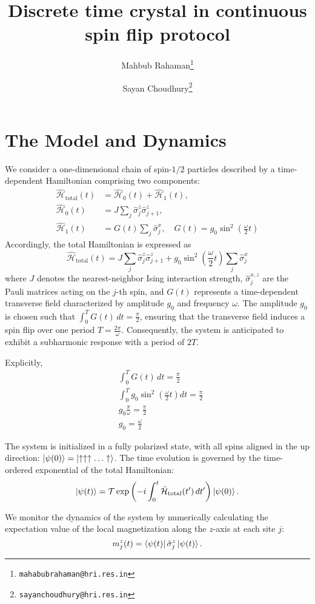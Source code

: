 \documentclass[a4paper, 11pt]{article}
\title{Discrete time crystal in continuous spin flip protocol}
\author[1]{Mahbub Rahaman\thanks{\texttt{mahabubrahaman@hri.res.in}}}
\author[1]{Sayan Choudhury\thanks{\texttt{sayanchoudhury@hri.res.in}}}
\affil[1]{\small Harish-Chandra Research Institute, HBNI, Chhatnag Road, Jhunsi, Praygraj, UP - 211019, India}
\date{}
\begin{document}
\maketitle

\section{The Model and Dynamics}
We consider a one-dimensional chain of spin-$1/2$ particles described by a time-dependent Hamiltonian comprising two components:
\begin{align}
    \hat{\mathcal{H}}_{\text{total}}(t) &=  \hat{\mathcal{H}}_0(t) + \hat{\mathcal{H}}_1(t), \\
    \hat{\mathcal{H}}_0(t) &= J\sum_{j} \hat{\sigma}_j^z \hat{\sigma}_{j+1}^z, \\
    \hat{\mathcal{H}}_1(t) &= G(t)\sum_{j}\hat{\sigma}_j^x, \quad G(t) = g_0\sin^2\left(\frac{\omega}{2} t\right)
\end{align}
Accordingly, the total Hamiltonian is expressed as
\begin{equation}
    \boxed{
        \hat{\mathcal{H}}_{\text{total}}(t) =  J\sum_{j} \hat{\sigma}_j^z \hat{\sigma}_{j+1}^z + g_0\sin^2\left(\frac{\omega}{2} t\right)\sum_{j}\hat{\sigma}_j^x
    }
\end{equation}
where $J$ denotes the nearest-neighbor Ising interaction strength, $\hat{\sigma}_j^{x,z}$ are the Pauli matrices acting on the $j$-th spin, and $G(t)$ represents a time-dependent transverse field characterized by amplitude $g_0$ and frequency $\omega$. The amplitude $g_0$ is chosen such that $\displaystyle \int_0^T G(t)\,dt = \frac{\pi}{2}$, ensuring that the transverse field induces a spin flip over one period $T = \frac{2\pi}{\omega}$. Consequently, the system is anticipated to exhibit a subharmonic response with a period of $2T$.

Explicitly,
\begin{align*}
    &\int_0^T G(t)\,dt = \frac{\pi}{2} \\
    &\int_0^T g_0\sin^2\left(\frac{\omega}{2}t \right) dt = \frac{\pi}{2}\\
    &g_0 \frac{\pi}{\omega} = \frac{\pi}{2}\\
    &\boxed{g_0 = \frac{\omega}{2}}
\end{align*}
 
The system is initialized in a fully polarized state, with all spins aligned in the up direction: $\displaystyle\ket{\psi(0)} = \ket{\uparrow\uparrow\uparrow\ldots\uparrow}$. The time evolution is governed by the time-ordered exponential of the total Hamiltonian:
\begin{equation}
    \ket{\psi(t)} = \mathcal{T} \exp\left(-i\int_0^t \hat{\mathcal{H}}_{\text{total}}(t')\,dt'\right) \ket{\psi(0)}.
\end{equation}

We monitor the dynamics of the system by numerically calculating the expectation value of the local magnetization along the $z$-axis at each site $j$:
\begin{equation}
    m_j^z(t) = \bra{\psi(t)} \hat{\sigma}_j^z \ket{\psi(t)}.
\end{equation}  
\end{document}
